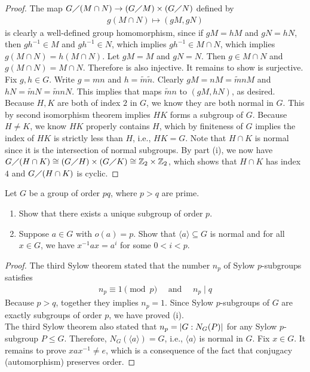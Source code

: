 \documentclass{report}
\begin{document}
\begin{proof}
The map $G\diagup (M\cap N) \rightarrow (G \diagup M)\times (G\diagup N)$ defined by 
\begin{align}
\label{EQmg}
g(M\cap N) \mapsto (gM,gN)
\end{align}
is clearly a well-defined group homomorphism, since if $gM=hM$ and  $gN=hN$, then  $gh^{-1}\in M$ and $gh^{-1} \in N$, which implies $gh^{-1}\in M \cap N$, which implies $g(M\cap N)=h(M \cap N)$. Let $gM=M$ and  $gN=N$. Then  $g \in M \cap N$ and $g(M \cap N)=M \cap N$. Therefore  is also injective. It remains to show  is surjective. Fix $g,h \in G$. Write $g=mn$ and  $h=\tilde{m}\tilde{n}$. Clearly $gM=nM=\tilde{m}nM$ and  $hN=\tilde{m}N=\tilde{m}nN $. This implies that   maps $\tilde{m}n$ to $(gM,hN)$, as desired.\\

Because $H,K$ are both of index  $2$ in $G$, we know they are both normal in $G$. This by second isomorphism theorem implies  $HK$ forms a subgroup of  $G$. Because $H\neq K$, we know $HK$ properly contains $H$, which by finiteness of $G$ implies  the index of $HK$ is strictly less than  $H$, i.e., $HK=G$. Note that $H \cap K$ is normal since it is the intersection of normal subgroups. By part (i), we now have $G \diagup (H\cap K)\cong  (G \diagup H)\times (G\diagup K)\cong  \mathbb{Z}_2\times\mathbb{Z}_2$, which shows that $H \cap K$ has index $4$ and  $G \diagup (H\cap K)$ is cyclic.     
\end{proof}
\begin{question}{}{}
Let $G$ be a group of order  $pq$, where  $p>q$ are prime. 
\begin{enumerate}[label=(\roman*)]
  \item Show that there exists a unique subgroup of order $p$.  
  \item Suppose $a \in G$ with $o(a)=p$. Show that $\langle a\rangle \subseteq G$ is normal and for all $x \in G$, we have $x^{-1}ax =a^i$ for some $0<i<p$. 
\end{enumerate}
\end{question}
\begin{proof}
The third Sylow theorem stated that the number $n_p$ of Sylow $p$-subgroups satisfies 
\begin{align*}
n_p\equiv 1\pmod{p} \quad \text{ and }\quad n_p \mid q
\end{align*}
Because $p>q$, together they implies $n_p=1$. Since Sylow $p$-subgroups of  $G$ are exactly subgroups of order  $p$, we have proved (i).  \\

The third Sylow theorem also stated that $n_p= \left|G:N_G(P)\right|$ for any Sylow $p$-subgroup  $P\leq G$. Therefore, $N_G(\langle a\rangle )=G$, i.e., $\langle a\rangle $ is normal in $G$. Fix  $x\in G$. It remains to prove $xax^{-1}\neq e$, which is a consequence of the fact that conjugacy (automorphism) preserves order.
\end{proof}
\end{document}
